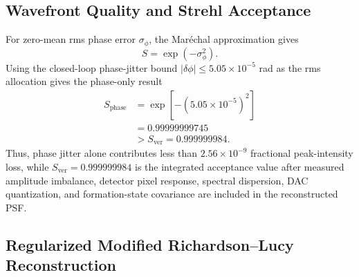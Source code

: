 \documentclass[10pt,twocolumn]{IEEEtran}
\begin{document}
\subsection{Wavefront Quality and Strehl Acceptance}

For zero-mean rms phase error $\sigma_\phi$, the Mar\'echal approximation gives
\begin{equation}
S=\exp\left(-\sigma_\phi^2\right).
\label{eq:strehl_definition}
\end{equation}
Using the closed-loop phase-jitter bound $|\delta\phi|\leq5.05\times10^{-5}$ rad as the rms allocation gives the phase-only result
\begin{equation}
\begin{aligned}
S_{\mathrm{phase}}
&=\exp\left[-\left(5.05\times10^{-5}\right)^2\right] \\
&=0.99999999745 \\
&>S_{\mathrm{ver}}=0.999999984.
\end{aligned}
\label{eq:strehl_acceptance}
\end{equation}
Thus, phase jitter alone contributes less than $2.56\times10^{-9}$ fractional peak-intensity loss, while $S_{\mathrm{ver}}=0.999999984$ is the integrated acceptance value after measured amplitude imbalance, detector pixel response, spectral dispersion, DAC quantization, and formation-state covariance are included in the reconstructed PSF.

\subsection{Regularized Modified Richardson--Lucy Reconstruction}
\end{document}
